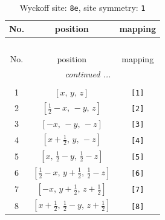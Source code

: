 \documentclass[fleqn,8pt]{jsarticle}
\begin{document}
\renewcommand{\arraystretch}{1.2}
\begin{longtable}{ccc}
\caption{Wyckoff site: {\tt 8e}, site symmetry: {\tt 1}}
 \\
 \hline \hline
No. & position & mapping \\ \hline \endfirsthead

\multicolumn{2}{l}{\tablename\ \thetable{}} \\
 \hline \hline
No. & position & mapping \\ \hline \endhead

 \hline \hline
\multicolumn{2}{r}{\footnotesize\it continued ...} \\ \endfoot

 \hline \hline
\multicolumn{2}{r}{} \\ \endlastfoot

1 & $\left[ x,\, y,\, z \right]$ & {\tt [1]} \\ \hline
2 & $\left[ \frac{1}{2} - x,\, - y,\, z \right]$ & {\tt [2]} \\ \hline
3 & $\left[ - x,\, - y,\, - z \right]$ & {\tt [3]} \\ \hline
4 & $\left[ x + \frac{1}{2},\, y,\, - z \right]$ & {\tt [4]} \\ \hline
5 & $\left[ x,\, \frac{1}{2} - y,\, \frac{1}{2} - z \right]$ & {\tt [5]} \\ \hline
6 & $\left[ \frac{1}{2} - x,\, y + \frac{1}{2},\, \frac{1}{2} - z \right]$ & {\tt [6]} \\ \hline
7 & $\left[ - x,\, y + \frac{1}{2},\, z + \frac{1}{2} \right]$ & {\tt [7]} \\ \hline
8 & $\left[ x + \frac{1}{2},\, \frac{1}{2} - y,\, z + \frac{1}{2} \right]$ & {\tt [8]} \\
\end{longtable}
\end{document}
